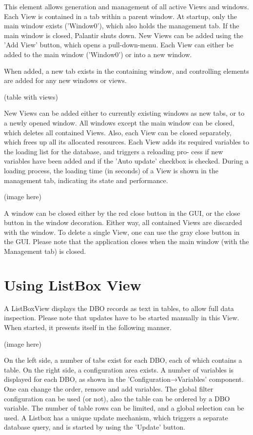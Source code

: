 \documentclass[10pt,letterpaper,extrafontsizes]{memoir}
\begin{document}
This element allows generation and management of all active Views and windows. Each View is contained
in a tab within a parent window.  At startup, only the main window exists ('Window0'), which also holds
the management tab. If the main window is closed, Palantir shuts down.
New Views can be added using the 'Add View' button, which opens a pull-down-menu. Each View can
either be added to the main window ('Window0') or into a new window.

When added, a new tab exists in the containing window, and controlling elements are added for any new
windows or views.

(table with views)

New Views can be added either to currently existing windows as new tabs, or to a newly opened window.
All windows except the main window can be closed, which deletes all contained Views.  Also, each View
can be closed separately, which frees up all its allocated resources.
Each View adds its required variables to the loading list for the database, and triggers a reloading pro-
cess if new variables have been added and if the 'Auto update' checkbox is checked.  During a loading
process, the loading time (in seconds) of a View is shown in the management tab, indicating its state and
performance.

(image here)

A window can be closed either by the red close button in the GUI, or the close button in the window
decoration.  Either way, all contained Views are discarded with the window.  To delete a single View, one
can use the gray close button in the GUI.
Please note that the application closes when the main window (with the Management tab) is closed.

\section{Using ListBox View}
A ListBoxView displays the DBO records as text in tables, to allow full data inspection.  Please
note that updates have to be started manually in this View. When started, it presents itself in the following manner.

(image here)

On the left side, a number of tabs exist for each DBO, each of which contains a table. On the right side,
a configuration area exists.
A number of variables is displayed for each DBO, as shown in the 'Configuration→Variables' component. One can change the order, remove and add variables. The global filter configuration can be used (or not), also the table can be ordered by a DBO variable.  The number of table rows can be limited, and a global selection can be used.
A Listbox has a unique update mechanism, which triggers a separate database query, and is started by
using the 'Update' button.
\end{document}
